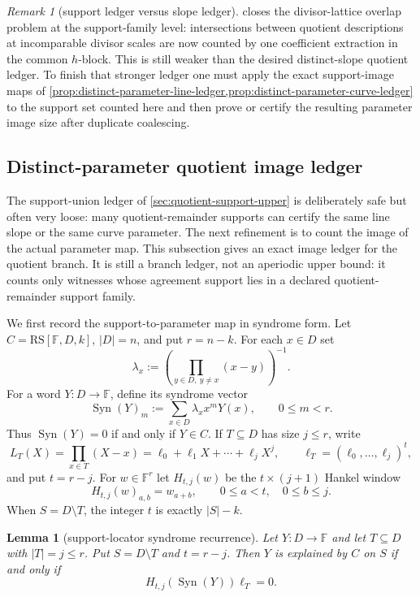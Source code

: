 \documentclass[11pt]{article}
\newtheorem{lemma}[lemma]{Lemma}
\theoremstyle{definition}
\theoremstyle{remark}
\newtheorem{remark}[remark]{Remark}
\newcommand{\F}{\mathbb{F}}
\newcommand{\RS}{\mathrm{RS}}
\newcommand{\Syn}{\operatorname{Syn}}
\begin{document}
\begin{remark}[support ledger versus slope ledger]
\label{rem:support-vs-slope-ledger}
 closes the divisor-lattice overlap
problem at the support-family level: intersections between quotient descriptions
at incomparable divisor scales are now counted by one coefficient extraction in
the common $h$-block.  This is still weaker than the desired distinct-slope
quotient ledger.  To finish that stronger ledger one must apply the exact
support-image maps of
\cref{prop:distinct-parameter-line-ledger,prop:distinct-parameter-curve-ledger}
to the support set counted here and then prove or certify the resulting parameter
image size after duplicate coalescing.
\end{remark}

\subsection{Distinct-parameter quotient image ledger}
\label{sec:quotient-distinct-parameter}

The support-union ledger of \cref{sec:quotient-support-upper} is deliberately
safe but often very loose: many quotient-remainder supports can certify the same
line slope or the same curve parameter.  The next refinement is to count the
image of the actual parameter map.  This subsection gives an exact image ledger
for the quotient branch.  It is still a branch ledger, not an aperiodic upper
bound: it counts only witnesses whose agreement support lies in a declared
quotient-remainder support family.

We first record the support-to-parameter map in syndrome form.  Let
$C=\RS[\F,D,k]$, $|D|=n$, and put $r=n-k$.  For each $x\in D$ set
\[
        \lambda_x:=\left(\prod_{y\in D,\ y\ne x}(x-y)\right)^{-1}.
\]
For a word $Y:D\to\F$, define its syndrome vector
\[
        \Syn(Y)_m:=\sum_{x\in D}\lambda_x x^mY(x),
        \qquad 0\le m<r .
\]
Thus $\Syn(Y)=0$ if and only if $Y\in C$.  If
$T\subseteq D$ has size $j\le r$, write
\[
        L_T(X)=\prod_{x\in T}(X-x)=\ell_0+\ell_1X+\cdots+\ell_jX^j,
        \qquad
        \boldsymbol\ell_T=(\ell_0,\ldots,\ell_j)^t,
\]
and put $t=r-j$.  For $w\in\F^r$ let $H_{t,j}(w)$ be the $t\times(j+1)$ Hankel
window
\[
        H_{t,j}(w)_{a,b}=w_{a+b},
        \qquad 0\le a<t,\quad 0\le b\le j .
\]
When $S=D\setminus T$, the integer $t$ is exactly $|S|-k$.


\begin{lemma}[support-locator syndrome recurrence]
\label{lem:support-locator-syndrome-recurrence}
Let $Y:D\to\F$ and let $T\subseteq D$ with $|T|=j\le r$.  Put
$S=D\setminus T$ and $t=r-j$.  Then $Y$ is explained by $C$ on $S$ if and only if
\[
        H_{t,j}(\Syn(Y))\boldsymbol\ell_T=0 .
\]
\end{lemma}
\end{document}
